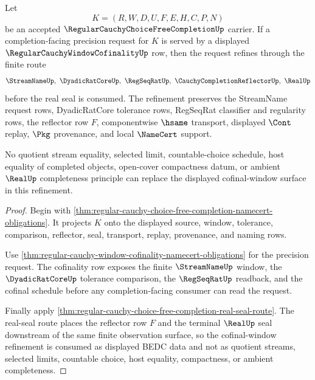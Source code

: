 \begin{theorem}
\label{thm:regular-cauchy-choice-free-completion-obligation-refinement}
Let
$$
K=(R,W,D,U,F,E,H,C,P,N)
$$
be an accepted $\RegularCauchyChoiceFreeCompletionUp$ carrier. If a completion-facing precision request for $K$ is served by a displayed $\RegularCauchyWindowCofinalityUp$ row, then the request refines through the finite route
$$
\StreamNameUp,\ \DyadicRatCoreUp,\ \RegSeqRatUp,\ \CauchyCompletionReflectorUp,\ \RealUp
$$
before the real seal is consumed. The refinement preserves the StreamName request rows, DyadicRatCore tolerance rows, RegSeqRat classifier and regularity rows, the reflector row $F$, componentwise $\hsame$ transport, displayed $\Cont$ replay, $\Pkg$ provenance, and local $\NameCert$ support.

No quotient stream equality, selected limit, countable-choice schedule, host equality of completed objects, open-cover compactness datum, or ambient $\RealUp$ completeness principle can replace the displayed cofinal-window surface in this refinement.
\end{theorem}
\begin{proof}
Begin with \autoref{thm:regular-cauchy-choice-free-completion-namecert-obligations}. It projects $K$ onto the displayed source, window, tolerance, comparison, reflector, seal, transport, replay, provenance, and naming rows.

Use \autoref{thm:regular-cauchy-window-cofinality-namecert-obligations} for the precision request. The cofinality row exposes the finite $\StreamNameUp$ window, the $\DyadicRatCoreUp$ tolerance comparison, the $\RegSeqRatUp$ readback, and the cofinal schedule before any completion-facing consumer can read the request.

Finally apply \autoref{thm:regular-cauchy-choice-free-completion-real-seal-route}. The real-seal route places the reflector row $F$ and the terminal $\RealUp$ seal downstream of the same finite observation surface, so the cofinal-window refinement is consumed as displayed BEDC data and not as quotient streams, selected limits, countable choice, host equality, compactness, or ambient completeness.
\end{proof}

